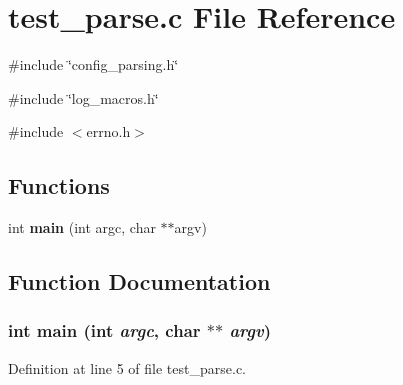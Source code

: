 \section{test\_\-parse.c File Reference}
\label{test__parse_8c}
{\ttfamily \#include \char`\"{}config\_\-parsing.h\char`\"{}}\par
{\ttfamily \#include \char`\"{}log\_\-macros.h\char`\"{}}\par
{\ttfamily \#include $<$errno.h$>$}\par
\subsection*{Functions}
\begin{DoxyCompactItemize}
\item 
int {\bf main} (int argc, char $\ast$$\ast$argv)
\end{DoxyCompactItemize}


\subsection{Function Documentation}
\subsubsection[{main}]{\setlength{\rightskip}{0pt plus 5cm}int main (int {\em argc}, \/  char $\ast$$\ast$ {\em argv})}\label{test__parse_8c_a3c04138a5bfe5d72780bb7e82a18e627}


Definition at line 5 of file test\_\-parse.c.